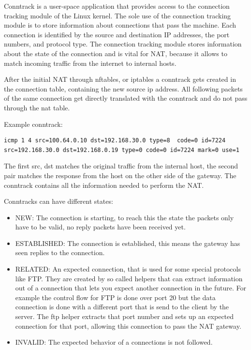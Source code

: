 \documentclass{report}
\begin{document}
Conntrack\cite{conntrack-tools} is a user-space application that provides access to the
connection tracking module\cite{conntrackSys} of the Linux kernel. The sole use of the
connection tracking module is to store information about connections
that pass the machine. Each connection is identified by the source and
destination IP addresses, the port numbers, and protocol type. The
connection tracking module stores information about the state of the
connection and is vital for NAT, because it allows to match incoming
traffic from the internet to internal hosts.

After the initial NAT through nftables, or iptables a conntrack gets
created in the connection table, containing the new source ip address.
All following packets of the same connection get directly translated
with the conntrack and do not pass through the nat table.

Example conntrack:

\begin{verbatim}
icmp 1 4 src=100.64.0.10 dst=192.168.30.0 type=8  code=0 id=7224
src=192.168.30.0 dst=192.168.0.19 type=0 code=0 id=7224 mark=0 use=1
\end{verbatim}

The first src, dst matches the original traffic from the internal host,
the second pair matches the response from the host on the other side of
the gateway. The conntrack contains all the information needed to
perform the NAT.

Conntracks can have different states:

\begin{itemize}
\item
  NEW: The connection is starting, to reach this the state the packets
  only have to be valid, no reply packets have been received yet.
\item
  ESTABLISHED: The connection is established, this means the gateway has
  seen replies to the connection.
\item
  RELATED: An expected connection, that is used for some special
  protocols like FTP. They are created by so called helpers that can
  extract information out of a connection that lets you expect another
  connection in the future. For example the control flow for FTP is done
  over port 20 but the data connection is done with a different port
  that is send to the client by the server. The ftp helper extracts that
  port number and sets up an expected connection for that port, allowing
  this connection to pass the NAT gateway.
\item
  INVALID: The expected behavior of a connections is not followed.
\end{itemize}
\end{document}
